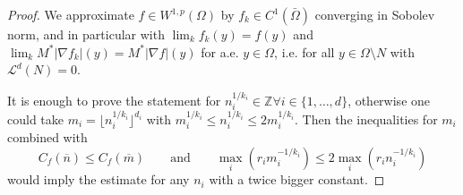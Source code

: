 \documentclass{amsart}
\theoremstyle{remark}
\numberwithin{equation}{section}
\numberwithin{figure}{section}
\def\v{\overline}
\begin{document}
\begin{proof}
	We approximate $f\in W^{1,p}(\Omega)$ by $f_k\in C^1(\bar\Omega)$ converging 
	in Sobolev norm, and in particular with
	$\lim_k f_k(y)= f(y)$ and
	$\lim_k M^*|\nabla f_k|(y)=  M^*|\nabla f|(y)$ for a.e. $y\in \Omega$, i.e. for all $y\in \Omega\setminus N$ with
	$\mathcal{L}^d (N)=0$.
	
	It is enough to prove the statement for $n_i^{1/k_i} \in \mathbb{Z} \forall i\in \{1, \ldots, d\}$, otherwise one could take $m_i = \lfloor n_i^{1/k_i}\rfloor ^ {d_i}$ with $m_i^{1/k_i} \leq n_i^{1/k_i} \leq 2m_i^{1/k_i}$. Then the inequalities for $m_i$ combined with
	\[
	C_f(\v n)\leq C_f(\v m ) \qquad \mbox{and} \qquad \max_i (r_i m_i^{-1/k_i}) \leq 2 \max_i (r_i n_i^{-1/k_i})
	\]
	would imply the estimate for any $n_i$ with a twice bigger constant.
	

\end{proof}
\end{document}
